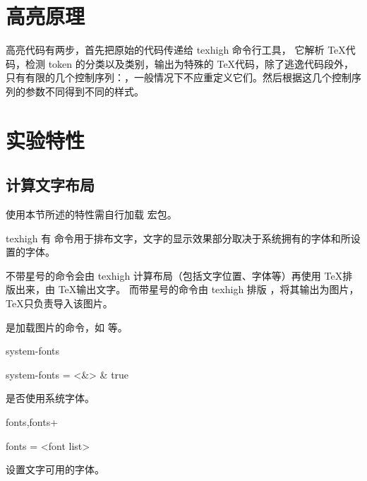 \documentclass[class=article,openany]{cusdoc}[2025/09/29]
\begin{document}
\section{高亮原理}

 高亮代码有两步，首先把原始的代码传递给 texhigh 命令行工具，
它解析 \TeX 代码，检测 token 的分类以及类别，输出为特殊的 \TeX 代码，除了逃逸代码段外，
只有有限的几个控制序列：{\makeatletter{}}，一般情况下不应重定义它们。然后根据这几个控制序列的参数不同得到不同的样式。


\section{实验特性}

\subsection{计算文字布局}

使用本节所述的特性需自行加载  宏包\autocite{fontspec}。

texhigh 有  命令用于排布文字，文字的显示效果部分取决于系统拥有的字体和所设置的字体。
\begin{function}{\kaomoji}
  \begin{syntax}
    \V\kaomoji   {} 
    \V\kaomoji *   
  \end{syntax}
不带星号的命令会由 texhigh 计算布局（包括文字位置、字体等）再使用 \TeX 排版出来，由 \TeX 输出文字。
而带星号的命令由 texhigh 排版 ，将其输出为图片，\TeX 只负责导入该图片。

 是加载图片的命令，如  等。
\end{function}

\begin{keyval}[path=layout]{system-fonts}
  \begin{syntax}
    system-fonts = <&\TTF> & true
  \end{syntax}
是否使用系统字体。
\end{keyval}

\begin{keyval}[path=layout]{fonts,fonts+}
  \begin{syntax}
    fonts = <{font list}>
  \end{syntax}
设置文字可用的字体。
\end{keyval}
\end{document}
